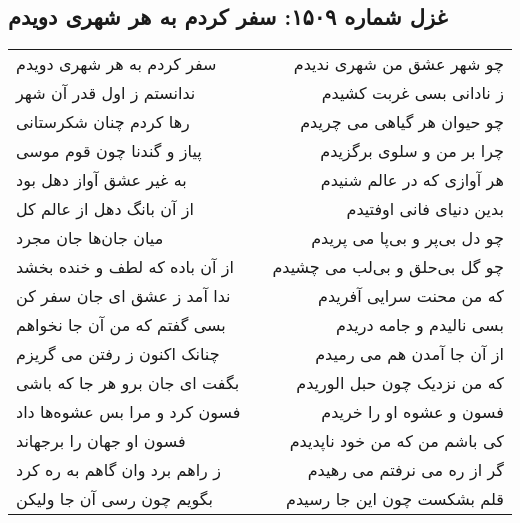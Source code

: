 \begin{center}
\section*{غزل شماره ۱۵۰۹: سفر کردم به هر شهری دویدم}
\label{sec:1509}
\begin{longtable}{l p{0.5cm} r}
سفر کردم به هر شهری دویدم
&&
چو شهر عشق من شهری ندیدم
\\
ندانستم ز اول قدر آن شهر
&&
ز نادانی بسی غربت کشیدم
\\
رها کردم چنان شکرستانی
&&
چو حیوان هر گیاهی می چریدم
\\
پیاز و گندنا چون قوم موسی
&&
چرا بر من و سلوی برگزیدم
\\
به غیر عشق آواز دهل بود
&&
هر آوازی که در عالم شنیدم
\\
از آن بانگ دهل از عالم کل
&&
بدین دنیای فانی اوفتیدم
\\
میان جان‌ها جان مجرد
&&
چو دل بی‌پر و بی‌پا می پریدم
\\
از آن باده که لطف و خنده بخشد
&&
چو گل بی‌حلق و بی‌لب می چشیدم
\\
ندا آمد ز عشق ای جان سفر کن
&&
که من محنت سرایی آفریدم
\\
بسی گفتم که من آن جا نخواهم
&&
بسی نالیدم و جامه دریدم
\\
چنانک اکنون ز رفتن می گریزم
&&
از آن جا آمدن هم می رمیدم
\\
بگفت ای جان برو هر جا که باشی
&&
که من نزدیک چون حبل الوریدم
\\
فسون کرد و مرا بس عشوه‌ها داد
&&
فسون و عشوه او را خریدم
\\
فسون او جهان را برجهاند
&&
کی باشم من که من خود ناپدیدم
\\
ز راهم برد وان گاهم به ره کرد
&&
گر از ره می نرفتم می رهیدم
\\
بگویم چون رسی آن جا ولیکن
&&
قلم بشکست چون این جا رسیدم
\\
\end{longtable}
\end{center}
